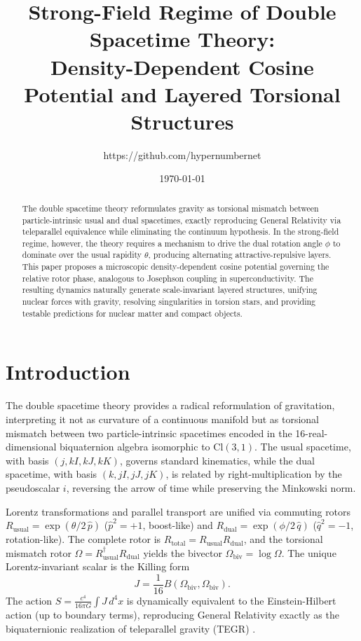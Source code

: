 \documentclass[a4paper]{article}
\title{Strong-Field Regime of Double Spacetime Theory:\\ Density-Dependent Cosine Potential and Layered Torsional Structures}
\author{https://github.com/hypernumbernet}
\date{\today}
\begin{document}
\maketitle

\begin{abstract}
The double spacetime theory reformulates gravity as torsional mismatch between particle-intrinsic usual and dual spacetimes, exactly reproducing General Relativity via teleparallel equivalence while eliminating the continuum hypothesis. In the strong-field regime, however, the theory requires a mechanism to drive the dual rotation angle $\phi$ to dominate over the usual rapidity $\theta$, producing alternating attractive-repulsive layers. This paper proposes a microscopic density-dependent cosine potential governing the relative rotor phase, analogous to Josephson coupling in superconductivity. The resulting dynamics naturally generate scale-invariant layered structures, unifying nuclear forces with gravity, resolving singularities in torsion stars, and providing testable predictions for nuclear matter and compact objects.
\end{abstract}

\section{Introduction}
\label{sec:introduction}

The double spacetime theory \cite{original-dst-paper} provides a radical reformulation of gravitation, interpreting it not as curvature of a continuous manifold but as torsional mismatch between two particle-intrinsic spacetimes encoded in the 16-real-dimensional biquaternion algebra isomorphic to $\mathrm{Cl}(3,1)$. The usual spacetime, with basis $(j, kI, kJ, kK)$, governs standard kinematics, while the dual spacetime, with basis $(k, jI, jJ, jK)$, is related by right-multiplication by the pseudoscalar $i$, reversing the arrow of time while preserving the Minkowski norm.

Lorentz transformations and parallel transport are unified via commuting rotors $R_\text{usual} = \exp(\theta/2 \, \hat{p})$ ($\hat{p}^2 = +1$, boost-like) and $R_\text{dual} = \exp(\phi/2 \, \hat{q})$ ($\hat{q}^2 = -1$, rotation-like). The complete rotor is $R_\text{total} = R_\text{usual} R_\text{dual}$, and the torsional mismatch rotor $\Omega = R_\text{usual}^\dagger R_\text{dual}$ yields the bivector $\Omega_\text{biv} = \log \Omega$. The unique Lorentz-invariant scalar is the Killing form
\[
J = \frac{1}{16} B(\Omega_\text{biv}, \Omega_\text{biv}).
\]
The action $S = \frac{c^4}{16\pi G} \int J \, d^4x$ is dynamically equivalent to the Einstein-Hilbert action (up to boundary terms), reproducing General Relativity exactly as the biquaternionic realization of teleparallel gravity (TEGR) \cite{maluf2013}.
\end{document}
